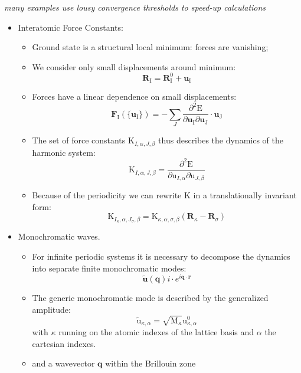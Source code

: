 \documentclass[landscape]{foils}
\begin{document}
{ {\em many examples use lousy convergence
    thresholds to speed-up calculations}}


\begin{itemize} 
\item Interatomic Force Constants: 
	\begin{itemize}
		\item Ground state is a structural local minimum: forces are vanishing; 
		\item We consider only small displacements around minimum:
			$$ \mathrm{\mathbf{R}_I} = \mathrm{\mathbf{R}^0_I} + \mathrm{\mathbf{u}_I} $$ 
	        \item  Forces have a linear dependence on small displacements: 
			$$ \mathrm{\mathbf{F}_I}(\{\mathrm{\mathbf{u}_I}\}) = -\sum_J{
				\frac{\partial^2{\mathrm{E}}}{\partial{\mathrm{\mathbf{u}_I}}\partial{\mathrm{\mathbf{u}_J}}}\cdot \mathrm{\mathbf{u}_J}
			} $$
		\item The set of force constants  $\mathrm{K}_{I,\alpha,J,\beta}$ thus  describes the dynamics of the harmonic system:  
			$$ \mathrm{K}_{I,\alpha,J,\beta}  = \frac{\partial^2{\mathrm{E}}}{\partial{\mathrm{u}_{I,\alpha}}\partial{\mathrm{u}_{J,\beta}}}$$
		\item Because of the periodicity we can rewrite $\mathrm{K}$ in a translationally invariant form:  
			$$ \mathrm{K}_{I_{\kappa},\alpha,J_{\sigma},\beta} = \mathrm{K}_{\kappa,\alpha,\sigma,\beta}(\mathrm{\mathbf{R}}_\kappa-\mathrm{\mathbf{R}}_\sigma)$$ 

	\end{itemize}
\end{itemize}
\begin {itemize}
\item Monochromatic waves. 
	\begin{itemize}
		\item For infinite periodic systems it is necessary to decompose the dynamics into separate finite monochromatic modes: 
			$$ \tilde{\mathrm{\mathbf{u}}}(\mathbf{q}) i\cdot e^{i\mathbf{q}\cdot\mathbf{r}}$$ 	
		\item The generic monochromatic mode is described by the generalized amplitude:  
			$$\tilde{\mathrm{u}}_{\kappa,\alpha} = \sqrt{\mathrm{M}_{\kappa}}\mathrm{u}^0_{\kappa,\alpha} $$ 
			with $\kappa$ running on the atomic indexes of the lattice basis and $\alpha$ the cartesian indexes.
		\item  and a wavevector $\mathrm{\mathbf{q}}$ within the Brillouin zone  
        \end{itemize}
\end{itemize}
\end{document}
